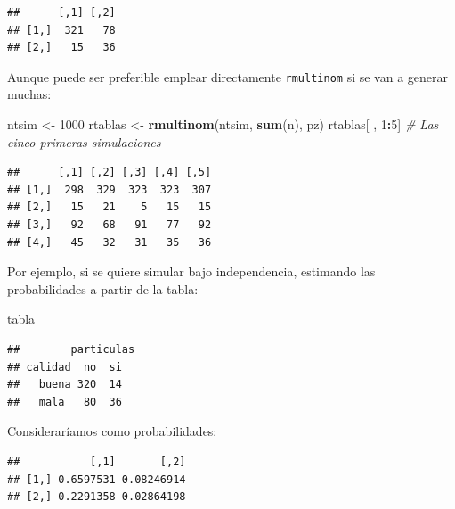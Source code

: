 \documentclass[
]{book}
\newenvironment{Shaded}{\begin{snugshade}}{\end{snugshade}}
\newcommand{\CommentTok}[1]{\textcolor[rgb]{0.56,0.35,0.01}{\textit{#1}}}
\newcommand{\DataTypeTok}[1]{\textcolor[rgb]{0.13,0.29,0.53}{#1}}
\newcommand{\DecValTok}[1]{\textcolor[rgb]{0.00,0.00,0.81}{#1}}
\newcommand{\KeywordTok}[1]{\textcolor[rgb]{0.13,0.29,0.53}{\textbf{#1}}}
\newcommand{\NormalTok}[1]{#1}
\newcommand{\OperatorTok}[1]{\textcolor[rgb]{0.81,0.36,0.00}{\textbf{#1}}}
\newcommand{\StringTok}[1]{\textcolor[rgb]{0.31,0.60,0.02}{#1}}
\theoremstyle{break}
\theoremstyle{definition}
\theoremstyle{definition}
\theoremstyle{definition}
\theoremstyle{remark}
\begin{document}
\begin{verbatim}
##      [,1] [,2]
## [1,]  321   78
## [2,]   15   36
\end{verbatim}

Aunque puede ser preferible emplear directamente \texttt{rmultinom}
si se van a generar muchas:

\begin{Shaded}
\begin{Highlighting}[]
\NormalTok{ntsim <-}\StringTok{ }\DecValTok{1000}
\NormalTok{rtablas <-}\StringTok{ }\KeywordTok{rmultinom}\NormalTok{(ntsim, }\KeywordTok{sum}\NormalTok{(n), pz)}
\NormalTok{rtablas[ , }\DecValTok{1}\OperatorTok{:}\DecValTok{5}\NormalTok{] }\CommentTok{# Las cinco primeras simulaciones}
\end{Highlighting}
\end{Shaded}

\begin{verbatim}
##      [,1] [,2] [,3] [,4] [,5]
## [1,]  298  329  323  323  307
## [2,]   15   21    5   15   15
## [3,]   92   68   91   77   92
## [4,]   45   32   31   35   36
\end{verbatim}

Por ejemplo, si se quiere simular bajo independencia,
estimando las probabilidades a partir de la tabla:

\begin{Shaded}
\begin{Highlighting}[]
\NormalTok{tabla}
\end{Highlighting}
\end{Shaded}

\begin{verbatim}
##        particulas
## calidad  no  si
##   buena 320  14
##   mala   80  36
\end{verbatim}

Consideraríamos como probabilidades:

\begin{Shaded}
\end{Shaded}

\begin{verbatim}
##           [,1]       [,2]
## [1,] 0.6597531 0.08246914
## [2,] 0.2291358 0.02864198
\end{verbatim}
\end{document}

